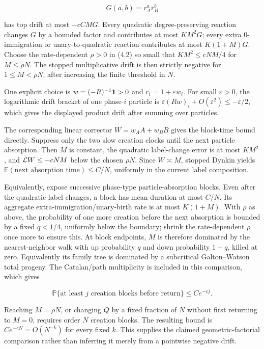 \[
 G(a,b)=r_A^a r_B^b
\]

has top drift at most \(-cCMG\). Every quadratic degree-preserving
reaction changes \(G\) by a bounded factor and contributes at most
\(K M^2G\); every extra \(0\)-immigration or unary-to-quadratic reaction
contributes at most \(K(1+M)G\). Choose the rate-dependent \(\rho>0\) in
(4.2) so small that \(KM^2\le cNM/4\) for \(M\le\rho N\). The stopped
multiplicative drift is then strictly negative for \(1\le M<\rho N\),
after increasing the finite threshold in \(N\).

One explicit choice is \(w=(-R)^{-1}{\bf1}>0\) and
\(r_i=1+\varepsilon w_i\). For small \(\varepsilon>0\), the logarithmic
drift bracket of one phase-\(i\) particle is
\(\varepsilon(Rw)_i+O(\varepsilon^2)\le-\varepsilon/2\), which gives the
displayed product drift after summing over particles.

The corresponding linear corrector \(W=w_AA+w_BB\) gives the block-time
bound directly. Suppress only the two slow creation clocks until the
next particle absorption. Then \(M\) is constant, the quadratic
label-change error is at most \(KM^2\), and \({\cal L}W\le-cNM\) below
the chosen \(\rho N\). Since \(W\asymp M\), stopped Dynkin yields
\({\mathbb E}(\text{next absorption time})\le C/N\), uniformly in the
current label composition.

Equivalently, expose successive phase-type particle-absorption blocks.
Even after the quadratic label changes, a block has mean duration at
most \(C/N\). Its aggregate extra-immigration/unary-birth rate is at
most \(K(1+M)\). With \(\rho\) as above, the probability of one more
creation before the next absorption is bounded by a fixed \(q<1/4\),
uniformly below the boundary; shrink the rate-dependent \(\rho\) once
more to ensure this. At block endpoints, \(M\) is therefore dominated by
the nearest-neighbor walk with up probability \(q\) and down probability
\(1-q\), killed at zero. Equivalently its family tree is dominated by a
subcritical Galton--Watson total progeny. The Catalan/path multiplicity
is included in this comparison, which gives

\[
 \mathbb P\{\text{at least }j\text{ creation blocks before return}\}
 \le Ce^{-cj}.
\]

Reaching \(M=\rho N\), or changing \(Q\) by a fixed fraction of \(N\)
without first returning to \(M=0\), requires order \(N\) creation
blocks. The resulting bound is \(Ce^{-cN}=O(N^{-k})\) for every fixed
\(k\). This supplies the claimed geometric-factorial comparison rather
than inferring it merely from a pointwise negative drift.

